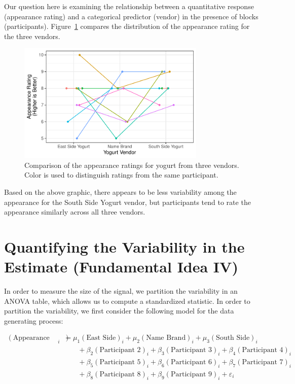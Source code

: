 \documentclass[
  letterpaper,
  DIV=11,
  numbers=noendperiod]{scrreprt}
\theoremstyle{definition}
\theoremstyle{definition}
\theoremstyle{plain}
\theoremstyle{remark}
\begin{document}
Our question here is examining the relationship between a quantitative
response (appearance rating) and a categorical predictor (vendor) in the
presence of blocks (participants). Figure~\ref{fig-blockrecap-plot}
compares the distribution of the appearance rating for the three
vendors.

\begin{figure}

{\centering \includegraphics[width=0.8\textwidth,height=\textheight]{./images/fig-blockrecap-plot-1.pdf}

}

\caption{\label{fig-blockrecap-plot}Comparison of the appearance ratings
for yogurt from three vendors. Color is used to distinguish ratings from
the same participant.}

\end{figure}

Based on the above graphic, there appears to be less variability among
the appearance for the South Side Yogurt vendor, but participants tend
to rate the appearance similarly across all three vendors.

\hypertarget{quantifying-the-variability-in-the-estimate-fundamental-idea-iv-2}{%
\section{Quantifying the Variability in the Estimate (Fundamental Idea
IV)}\label{quantifying-the-variability-in-the-estimate-fundamental-idea-iv-2}}

In order to measure the size of the signal, we partition the variability
in an ANOVA table, which allows us to compute a standardized statistic.
In order to partition the variability, we first consider the following
model for the data generating process:

\[
\begin{aligned}
  (\text{Appearance Rating})_i 
    &= \mu_1 (\text{East Side})_i + \mu_2 (\text{Name Brand})_i + \mu_3 (\text{South Side})_i \\
    &\qquad + \beta_2 (\text{Participant 2})_i + \beta_3 (\text{Participant 3})_i + \beta_4 (\text{Participant 4})_i \\
    &\qquad + \beta_5 (\text{Participant 5})_i + \beta_6 (\text{Participant 6})_i + \beta_7 (\text{Participant 7})_i \\
    &\qquad + \beta_8 (\text{Participant 8})_i + \beta_9 (\text{Participant 9})_i + \varepsilon_i
\end{aligned}
\]
\end{document}
